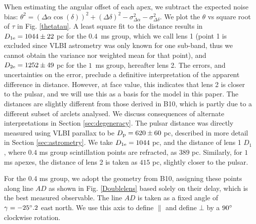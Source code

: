 \documentclass[useAMS,usenatbib]{mn2e}
\begin{document}
When estimating the angular offset of each apex,
we subtract the expected noise bias:
${\theta}^2=({\Delta\alpha}\cos(\delta))^2+({\Delta\delta})^2-\sigma^2_{\Delta\alpha}-\sigma^2_{\Delta\delta}$. 
We plot the $\theta$ vs square root of $\tau$ in Fig.
\ref{thetatau}. A least square fit to the distance results in
$D_{1{\rm e}}=1044\pm 22$ pc for the  $0.4$\ ms group, which we call
lens 1 (point 1 is excluded since VLBI astrometry was only known for
one sub-band, thus we cannot obtain the variance nor weighted mean for that point), and
$D_{2{\rm e}} = 1252 \pm 49$ pc for the $1$\ ms group, hereafter lens 2.
The errors, and uncertainties on the error, preclude a definitive
interpretation of the apparent difference in distance.  However, at face value, 
this indicates that lens 2 is closer to the pulsar, and we will
use this as a basis for the model in this paper.  
The distances are slightly different from those derived in
B10, which is partly due to a different subset
of arclets analysed. We discuss
consequences of alternate interpretations in Section \ref{sec:degeneracy}.
The pulsar distance was directly measured using VLBI parallax to be
$D_{\rm p} = 620 \pm 60$ pc, described in more detail in Section \ref{sec:astrometry}.  
We take $D_{1{\rm e}}=1044$ pc,  and the distance of lens 1 $D_{1}$,
where $0.4$ ms group scintillation points are refracted, as $389$
pc. Similarly, for $1$ ms apexes, the distance of lens 2 is taken as $415$ pc,
slightly closer to the pulsar.


For the 0.4 ms group, we adopt the geometry from
B10, assigning these points along line $AD$ as
shown in Fig. \ref{Doublelens} based solely on their delay, which is
the best measured observable. The line $AD$ is taken as a
fixed angle of $\gamma=-25\degree.2$ east north. We use this axis
to define ${\parallel}$ and define ${\bot}$ by a $90\degree$ clockwise
rotation.  
\end{document}
